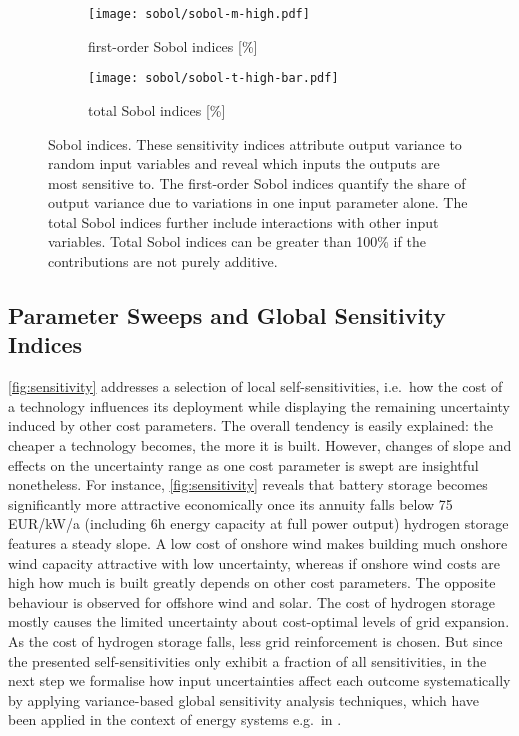 \begin{figure}
    \begin{subfigure}[t]{0.45\textwidth}
        \caption{first-order Sobol indices [\%]}
        \label{fig:sobol:first}
        \texttt{[image: sobol/sobol-m-high.pdf]}
    \end{subfigure}
    \begin{subfigure}[t]{0.54\textwidth}
        \caption{total Sobol indices [\%]}
        \label{fig:sobol:total}
        \texttt{[image: sobol/sobol-t-high-bar.pdf]}
    \end{subfigure}
    \vspace{-0.3cm}
    \caption[First-order and total Sobol indices]{
      Sobol indices. These sensitivity indices attribute output variance to random input variables
      and reveal which inputs the outputs are most sensitive to. The first-order Sobol indices
      quantify the share of output variance due to variations in one input parameter alone.
      The total Sobol indices further include interactions with other input variables.
      Total Sobol indices can be greater than 100\% if the contributions are not purely additive.
    }
    \label{fig:sobol}
\end{figure}

\subsection{Parameter Sweeps and Global Sensitivity Indices}

\cref{fig:sensitivity} addresses a selection of local self-sensitivities,
i.e.~how the cost of a technology influences its deployment while displaying the
remaining uncertainty induced by other cost parameters. The overall tendency is
easily explained: the cheaper a technology becomes, the more it is built.
However, changes of slope and effects on the uncertainty range as one cost
parameter is swept are insightful nonetheless. For instance,
\cref{fig:sensitivity} reveals that battery storage becomes significantly more
attractive economically once its annuity falls below 75 EUR/kW/a (including 6h
energy capacity at full power output) hydrogen storage features a steady slope.
A low cost of onshore wind makes building much onshore wind capacity attractive
with low uncertainty, whereas if onshore wind costs are high how much is built
greatly depends on other cost parameters.
The opposite behaviour is observed for offshore wind and solar.
The cost of hydrogen storage mostly causes the limited uncertainty about cost-optimal levels of grid expansion.
As the cost of hydrogen storage falls, less grid reinforcement is chosen.
But since the presented self-sensitivities only exhibit a fraction of all sensitivities,
in the next step we formalise how input uncertainties affect each outcome
systematically by applying variance-based global sensitivity analysis techniques, which
have been applied in the context of energy systems e.g.~in \cite{trondle_trade-offs_2020,mavromatidis_uncertainty_2018}.



